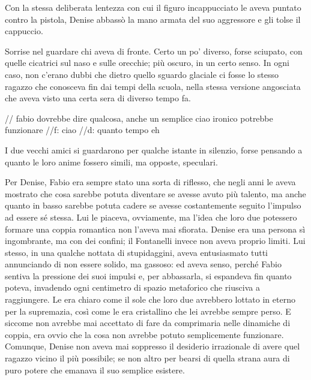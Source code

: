 Con la stessa deliberata lentezza con cui il figuro incappucciato le aveva puntato contro la pistola, Denise abbassò la mano armata del suo aggressore e gli tolse il cappuccio.

Sorrise nel guardare chi aveva di fronte. Certo un po' diverso, forse sciupato, con quelle cicatrici sul naso e sulle orecchie; più oscuro, in un certo senso. In ogni caso, non c'erano dubbi che dietro quello sguardo glaciale ci fosse lo stesso ragazzo che conosceva fin dai tempi della scuola, nella stessa versione angosciata che aveva visto una certa sera di diverso tempo fa.

// fabio dovrebbe dire qualcosa, anche un semplice ciao ironico potrebbe funzionare
//f: ciao
//d: quanto tempo eh

I due vecchi amici si guardarono per qualche istante in silenzio, forse pensando a quanto le loro anime fossero simili, ma opposte, speculari.

Per Denise, Fabio era sempre stato una sorta di riflesso, che negli anni le aveva mostrato che cosa sarebbe potuta diventare se avesse avuto più talento, ma anche quanto in basso sarebbe potuta cadere se avesse costantemente seguito l'impulso ad essere sé stessa. Lui le piaceva, ovviamente, ma l'idea che loro due potessero formare una coppia romantica non l'aveva mai sfiorata. Denise era una persona sì ingombrante, ma con dei confini; il Fontanelli invece non aveva proprio limiti. Lui stesso, in una qualche nottata di stupidaggini, aveva entusiasmato tutti annunciando di non essere solido, ma gassoso: ed aveva senso, perché Fabio sentiva la pressione dei suoi impulsi e, per abbassarla, si espandeva fin quanto poteva, invadendo ogni centimetro di spazio metaforico che riusciva a raggiungere. Le era chiaro come il sole che loro due avrebbero lottato in eterno per la supremazia, così come le era cristallino che lei avrebbe sempre perso. E siccome non avrebbe mai accettato di fare da comprimaria nelle dinamiche di coppia, era ovvio che la cosa non avrebbe potuto semplicemente funzionare. Comunque, Denise non aveva mai soppresso il desiderio irrazionale di avere quel ragazzo vicino il più possibile; se non altro per bearsi di quella strana aura di puro potere che emanava il suo semplice esistere.

